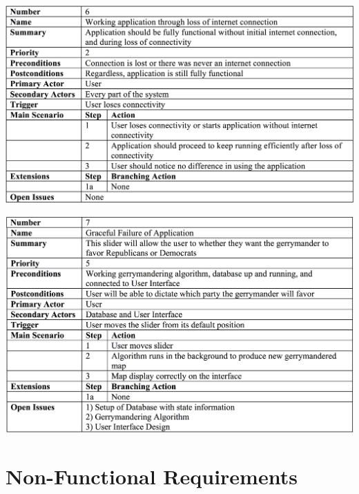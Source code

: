 \documentclass{article}
\begin{document}
\begin{addmargin}[4em]{0em}
\begin{center}
\hspace*{-2cm}      
\includegraphics[scale=.25]{LossOfNetwork.png}
\end{center}

\begin{center}
\hspace*{-2cm}      
\includegraphics[scale=.25]{Failures.png}
\end{center}

\end{addmargin}

\vspace{2.5mm}


\section{Non-Functional Requirements}\label{sec:non-functionalReq}

\vspace{2.5mm}
\end{document}
